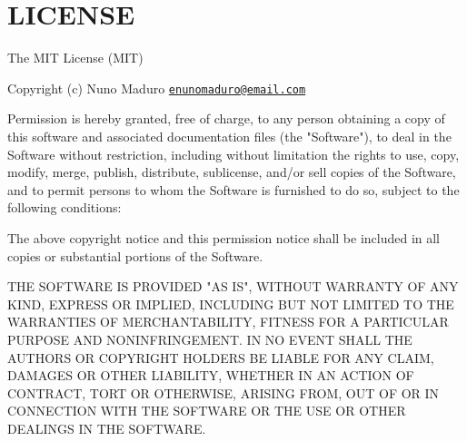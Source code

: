 \chapter{LICENSE }
\hypertarget{md__c_1_2xampp_2htdocs_2_g_pagos_ayuntamiento_2vendor_2pestphp_2pest-plugin_2_l_i_c_e_n_s_e}{}\label{md__c_1_2xampp_2htdocs_2_g_pagos_ayuntamiento_2vendor_2pestphp_2pest-plugin_2_l_i_c_e_n_s_e}
The MIT License (MIT)

Copyright (c) Nuno Maduro \href{mailto:enunomaduro@email.com}{\texttt{enunomaduro@email.\+com}}

Permission is hereby granted, free of charge, to any person obtaining a copy of this software and associated documentation files (the "{}\+Software"{}), to deal in the Software without restriction, including without limitation the rights to use, copy, modify, merge, publish, distribute, sublicense, and/or sell copies of the Software, and to permit persons to whom the Software is furnished to do so, subject to the following conditions\+:

The above copyright notice and this permission notice shall be included in all copies or substantial portions of the Software.

THE SOFTWARE IS PROVIDED "{}\+AS IS"{}, WITHOUT WARRANTY OF ANY KIND, EXPRESS OR IMPLIED, INCLUDING BUT NOT LIMITED TO THE WARRANTIES OF MERCHANTABILITY, FITNESS FOR A PARTICULAR PURPOSE AND NONINFRINGEMENT. IN NO EVENT SHALL THE AUTHORS OR COPYRIGHT HOLDERS BE LIABLE FOR ANY CLAIM, DAMAGES OR OTHER LIABILITY, WHETHER IN AN ACTION OF CONTRACT, TORT OR OTHERWISE, ARISING FROM, OUT OF OR IN CONNECTION WITH THE SOFTWARE OR THE USE OR OTHER DEALINGS IN THE SOFTWARE. 
